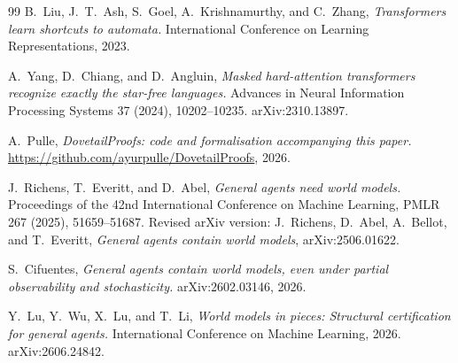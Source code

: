 \documentclass[10pt]{article}
\theoremstyle{definition}
\theoremstyle{remark}
\begin{document}
\begin{thebibliography}{99}
B.~Liu, J.~T.~Ash, S.~Goel, A.~Krishnamurthy, and C.~Zhang,
\emph{Transformers learn shortcuts to automata.}
International Conference on Learning Representations, 2023.

A.~Yang, D.~Chiang, and D.~Angluin,
\emph{Masked hard-attention transformers recognize exactly the
star-free languages.}
Advances in Neural Information Processing Systems 37 (2024),
10202--10235.  arXiv:2310.13897.

A.~Pulle,
\emph{DovetailProofs: code and formalisation accompanying this paper.}
\url{https://github.com/ayurpulle/DovetailProofs}, 2026.

J.~Richens, T.~Everitt, and D.~Abel,
\emph{General agents need world models.}
Proceedings of the 42nd International Conference on Machine Learning,
PMLR 267 (2025), 51659--51687.  Revised arXiv version: J.~Richens, D.~Abel,
A.~Bellot, and T.~Everitt, \emph{General agents contain world models},
arXiv:2506.01622.

S.~Cifuentes,
\emph{General agents contain world models, even under partial observability and
stochasticity.}
arXiv:2602.03146, 2026.

Y.~Lu, Y.~Wu, X.~Lu, and T.~Li,
\emph{World models in pieces: Structural certification for general agents.}
International Conference on Machine Learning, 2026.  arXiv:2606.24842.

\end{thebibliography}
\end{document}
